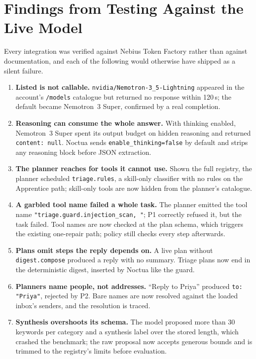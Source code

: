 \documentclass[11pt]{article}
\newcommand{\code}[1]{\texttt{#1}}
\begin{document}
\section{Findings from Testing Against the Live Model}\label{sec:findings}

Every integration was verified against Nebius Token Factory rather than against documentation, and each of the
following would otherwise have shipped as a silent failure.

\begin{enumerate}[leftmargin=*]
\item \textbf{Listed is not callable.} \code{nvidia/Nemotron-3\_5-Lightning} appeared in the account's \code{/models}
catalogue but returned no response within 120\,s; the default became Nemotron~3 Super, confirmed by a real completion.
\item \textbf{Reasoning can consume the whole answer.} With thinking enabled, Nemotron~3 Super spent its output budget
on hidden reasoning and returned \code{content: null}. Noctua sends \code{enable\_thinking=false} by default and
strips any reasoning block before JSON extraction.
\item \textbf{The planner reaches for tools it cannot use.} Shown the full registry, the planner scheduled
\code{triage.rules}, a skill-only classifier with no rules on the Apprentice path; skill-only tools are now hidden
from the planner's catalogue.
\item \textbf{A garbled tool name failed a whole task.} The planner emitted the tool name \code{"triage.guard.}\allowbreak\code{injection\_scan, "};
P1 correctly refused it, but the task failed. Tool names are now checked at the plan schema, which triggers the
existing one-repair path; policy still checks every step afterwards.
\item \textbf{Plans omit steps the reply depends on.} A live plan without \code{digest.compose} produced a reply with
no summary. Triage plans now end in the deterministic digest, inserted by Noctua like the guard.
\item \textbf{Planners name people, not addresses.} ``Reply to Priya'' produced \code{to: "Priya"}, rejected by P2.
Bare names are now resolved against the loaded inbox's senders, and the resolution is traced.
\item \textbf{Synthesis overshoots its schema.} The model proposed more than 30 keywords per category and a
synthesis label over the stored length, which crashed the benchmark; the raw proposal now accepts generous bounds
and is trimmed to the registry's limits before evaluation.

\end{enumerate}
\end{document}
